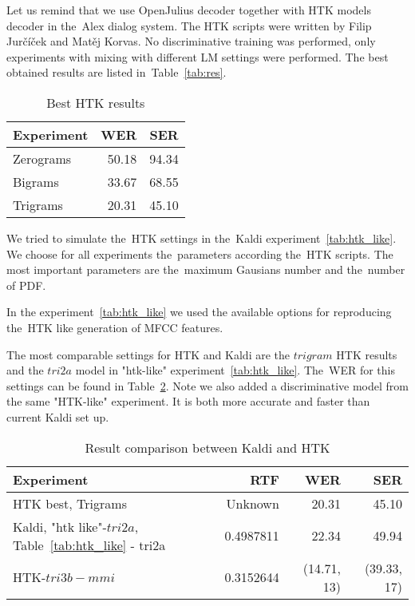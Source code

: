 Let us remind that we use OpenJulius decoder together with HTK models decoder in the~Alex dialog system.
The \ac{HTK} scripts were written by Filip Jurčíček and Matěj Korvas. No discriminative training was performed,
only experiments with mixing with different \acl{LM} settings were performed. 
The best obtained results are listed in~Table~\ref{tab:res}.

\begin{table}[!htp]\label{tab:htk_res}\centering\begin{tabular}{l|rr}
Experiment      & \ac{WER} & \ac{SER} \\
\hline
    Zerograms      & 50.18  & 94.34  \\
    Bigrams        & 33.67  & 68.55  \\
    Trigrams       & 20.31  & 45.10  \\
\end{tabular}
\caption{Best \ac{HTK} results}
\end{table}  

We tried to simulate the~\ac{HTK} settings in the~Kaldi experiment~\ref{tab:htk_like}.
We choose for all experiments the~parameters according the~\ac{HTK} scripts.
The most important parameters are the~maximum Gausians number and the~number of \acl{PDF}.

In the experiment~\ref{tab:htk_like} we used the available options for reproducing the~\ac{HTK} like generation
of \ac{MFCC} features.

The most comparable settings for \ac{HTK} and Kaldi are the $trigram$ \ac{HTK} results
and the $tri2a$ model in "htk-like" experiment~\ref{tab:htk_like}. 
The~\ac{WER} for this settings can be found in Table~\ref{tab:compare}.
Note we also added a discriminative model from the same "\ac{HTK}-like" experiment.
It is both more accurate and faster than current Kaldi set up.

\begin{table}[!htp]\label{tab:compare}\centering\begin{tabular}{l|rrr}
    Experiment   & \ac{RTF} & \ac{WER} & \ac{SER} \\
\hline
\hline
\ac{HTK} best, Trigrams   & Unknown  & 20.31  & 45.10  \\
Kaldi, "htk like"-$tri2a$, Table~\ref{tab:htk_like} - tri2a & 0.4987811 & 22.34 & 49.94\\
\hline
\ac{HTK}-$tri3b-mmi$       & 0.3152644     & (14.71, 13) & (39.33, 17)\\ 
\end{tabular} \caption{Result comparison between Kaldi and \ac{HTK}} \end{table}  


